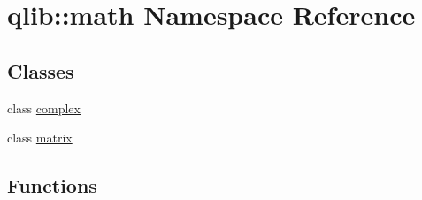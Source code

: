 \hypertarget{namespaceqlib_1_1math}{}\section{qlib\+:\+:math Namespace Reference}
\label{namespaceqlib_1_1math}
\subsection*{Classes}
\begin{DoxyCompactItemize}
\item 
class \hyperlink{classqlib_1_1math_1_1complex}{complex}
\item 
class \hyperlink{classqlib_1_1math_1_1matrix}{matrix}
\end{DoxyCompactItemize}
\subsection*{Functions}
